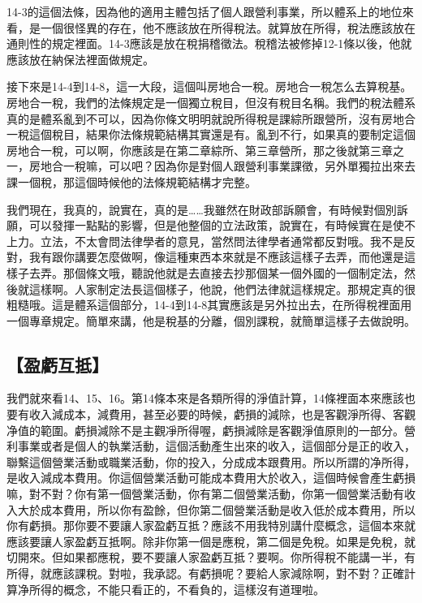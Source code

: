 \documentclass[]{ctexbook}
\begin{document}
14-3的這個法條，因為他的適用主體包括了個人跟營利事業，所以體系上的地位來看，是一個很怪異的存在，他不應該放在所得稅法。就算放在所得，稅法應該放在通則性的規定裡面。14-3應該是放在稅捐稽徵法。稅稽法被修掉12-1條以後，他就應該放在納保法裡面做規定。

接下來是14-4到14-8，這一大段，這個叫房地合一稅。房地合一稅怎么去算稅基。房地合一稅，我們的法條規定是一個獨立稅目，但沒有稅目名稱。我們的稅法體系真的是體系亂到不可以，因為你條文明明就說所得稅是課綜所跟營所，沒有房地合一稅這個稅目，結果你法條規範結構其實還是有。亂到不行，如果真的要制定這個房地合一稅，可以啊，你應該是在第二章綜所、第三章營所，那之後就第三章之一，房地合一稅嘛，可以吧？因為你是對個人跟營利事業課徵，另外單獨拉出來去課一個稅，那這個時候他的法條規範結構才完整。

我們現在，我真的，說實在，真的是\ldots\ldots 我雖然在財政部訴願會，有時候對個別訴願，可以發揮一點點的影響，但是他整個的立法政策，說實在，有時候實在是使不上力。立法，不太會問法律學者的意見，當然問法律學者通常都反對哦。我不是反對，我有跟你講要怎麼做啊，像這種東西本來就是不應該這樣子去弄，而他還是這樣子去弄。那個條文哦，聽說他就是去直接去抄那個某一個外國的一個制定法，然後就這樣啊。人家制定法長這個樣子，他說，他們法律就這樣規定。那規定真的很粗糙哦。這是體系這個部分，14-4到14-8其實應該是另外拉出去，在所得稅裡面用一個專章規定。簡單來講，他是稅基的分離，個別課稅，就簡單這樣子去做說明。

\hypertarget{ux76c8ux8667ux4e92ux62b5}{%
\subsection{【盈虧互抵】}\label{ux76c8ux8667ux4e92ux62b5}}

我們就來看14、15、16。第14條本來是各類所得的淨值計算，14條裡面本來應該也要有收入減成本，減費用，甚至必要的時候，虧損的減除，也是客觀淨所得、客觀净值的範圍。虧損減除不是主觀凈所得喔，虧損減除是客觀淨值原則的一部分。營利事業或者是個人的執業活動，這個活動產生出來的收入，這個部分是正的收入，聯繫這個營業活動或職業活動，你的投入，分成成本跟費用。所以所謂的净所得，是收入減成本費用。你這個營業活動可能成本費用大於收入，這個時候會產生虧損嘛，對不對？你有第一個營業活動，你有第二個營業活動，你第一個營業活動有收入大於成本費用，所以你有盈餘，但你第二個營業活動是收入低於成本費用，所以你有虧損。那你要不要讓人家盈虧互抵？應該不用我特別講什麼概念，這個本來就應該要讓人家盈虧互抵啊。除非你第一個是應稅，第二個是免稅。如果是免稅，就切開來。但如果都應稅，要不要讓人家盈虧互抵？要啊。你所得稅不能講一半，有所得，就應該課稅。對啦，我承認。有虧損呢？要給人家減除啊，對不對？正確計算净所得的概念，不能只看正的，不看負的，這樣沒有道理啦。
\end{document}
